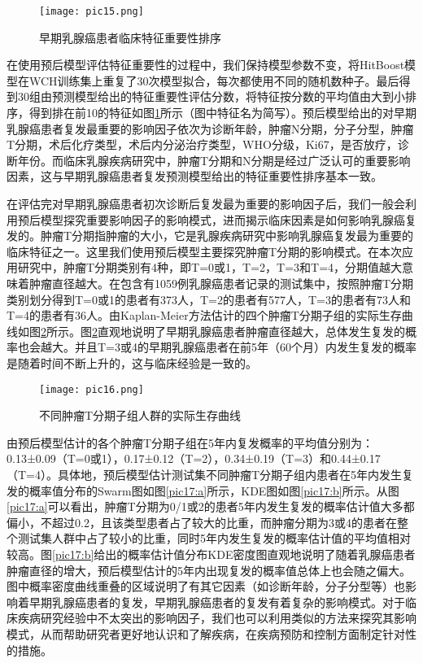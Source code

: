 \begin{figure}[H]
\texttt{[image: pic15.png]}
\caption{早期乳腺癌患者临床特征重要性排序}
\label{pic15}
\end{figure}

在使用预后模型评估特征重要性的过程中，我们保持模型参数不变，将HitBoost模型在WCH训练集上重复了30次模型拟合，每次都使用不同的随机数种子。最后得到30组由预测模型给出的特征重要性评估分数，将特征按分数的平均值由大到小排序，得到排在前10的特征如图\ref{pic15}所示（图中特征名为简写）。预后模型给出的对早期乳腺癌患者复发最重要的影响因子依次为诊断年龄，肿瘤N分期，分子分型，肿瘤T分期，术后化疗类型，术后内分泌治疗类型，WHO分级，Ki67，是否放疗，诊断年份。而临床乳腺疾病研究中，肿瘤T分期和N分期是经过广泛认可的重要影响因素，这与早期乳腺癌患者复发预测模型给出的特征重要性排序基本一致。

在评估完对早期乳腺癌患者初次诊断后复发最为重要的影响因子后，我们一般会利用预后模型探究重要影响因子的影响模式，进而揭示临床因素是如何影响乳腺癌复发的。肿瘤T分期指肿瘤的大小，它是乳腺疾病研究中影响乳腺癌复发最为重要的临床特征之一。这里我们使用预后模型主要探究肿瘤T分期的影响模式。在本次应用研究中，肿瘤T分期类别有4种，即T=0或1，T=2，T=3和T=4，分期值越大意味着肿瘤直径越大。在包含有1059例乳腺癌患者记录的测试集中，按照肿瘤T分期类别划分得到T=0或1的患者有373人，T=2的患者有577人，T=3的患者有73人和T=4的患者有36人。由Kaplan-Meier方法估计的四个肿瘤T分期子组的实际生存曲线如图\ref{pic16}所示。图\ref{pic16}直观地说明了早期乳腺癌患者肿瘤直径越大，总体发生复发的概率也会越大。并且T=3或4的早期乳腺癌患者在前5年（60个月）内发生复发的概率是随着时间不断上升的，这与临床经验是一致的。

\begin{figure}[H]
\texttt{[image: pic16.png]}
\caption{不同肿瘤T分期子组人群的实际生存曲线}
\label{pic16}
\end{figure}

由预后模型估计的各个肿瘤T分期子组在5年内复发概率的平均值分别为：0.13±0.09（T=0或1），0.17±0.12（T=2），0.34±0.19（T=3）和0.44±0.17（T=4）。具体地，预后模型估计测试集不同肿瘤T分期子组内患者在5年内发生复发的概率值分布的Swarm图如图\ref{pic17:a}所示，KDE图如图\ref{pic17:b}所示。从图\ref{pic17:a}可以看出，肿瘤T分期为0/1或2的患者5年内发生复发的概率估计值大多都偏小，不超过0.2，且该类型患者占了较大的比重，而肿瘤分期为3或4的患者在整个测试集人群中占了较小的比重，同时5年内发生复发的概率估计值的平均值相对较高。图\ref{pic17:b}给出的概率估计值分布KDE密度图直观地说明了随着乳腺癌患者肿瘤直径的增大，预后模型估计的5年内出现复发的概率值总体上也会随之偏大。图中概率密度曲线重叠的区域说明了有其它因素（如诊断年龄，分子分型等）也影响着早期乳腺癌患者的复发，早期乳腺癌患者的复发有着复杂的影响模式。对于临床疾病研究经验中不太突出的影响因子，我们也可以利用类似的方法来探究其影响模式，从而帮助研究者更好地认识和了解疾病，在疾病预防和控制方面制定针对性的措施。

